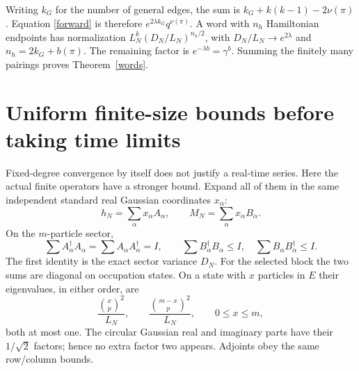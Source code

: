 \documentclass[11pt]{article}
\newcommand{\bn}[2]{\binom{#1}{#2}}
\begin{document}
Writing $k_G$ for the number of general edges, the sum is
$k_G+k(k-1)-2\nu(\pi)$. Equation \eqref{forward} is therefore
$e^{2\lambda k_G}q^{\nu(\pi)}$. A word with $n_h$ Hamiltonian
endpoints has normalization $L_N^k(D_N/L_N)^{n_h/2}$, with
$D_N/L_N\to e^{2\lambda}$ and $n_h=2k_G+b(\pi)$.
The remaining factor is $e^{-\lambda b}=\gamma^b$.
Summing the finitely many pairings proves Theorem~\ref{words}.

\newpage
\section{Uniform finite-size bounds before taking time limits}
Fixed-degree convergence by itself does not justify a real-time
series. Here the actual finite operators have a stronger bound.
Expand all of them in the same independent standard real Gaussian
coordinates $x_\alpha$:
\begin{equation}
 h_N=\sum_\alpha x_\alpha A_\alpha,\qquad
 M_N=\sum_\alpha x_\alpha B_\alpha.
\end{equation}
On the $m$-particle sector,
\begin{equation}\label{rowcol}
 \sum A_\alpha^\dagger A_\alpha=
 \sum A_\alpha A_\alpha^\dagger=I,\qquad
 \sum B_\alpha^\dagger B_\alpha\le I,\quad
 \sum B_\alpha B_\alpha^\dagger\le I.
\end{equation}
The first identity is the exact sector variance $D_N$.
For the selected block the two sums are diagonal on occupation
states. On a state with $x$ particles in $E$ their eigenvalues,
in either order, are
\begin{equation}
 \frac{\bn xp^2}{L_N},\qquad
 \frac{\bn{m-x}p^2}{L_N},
 \qquad 0\le x\le m,
\end{equation}
both at most one. The circular Gaussian real and imaginary
parts have their $1/\sqrt2$ factors; hence no extra factor two
appears. Adjoints obey the same row/column bounds.
\end{document}
